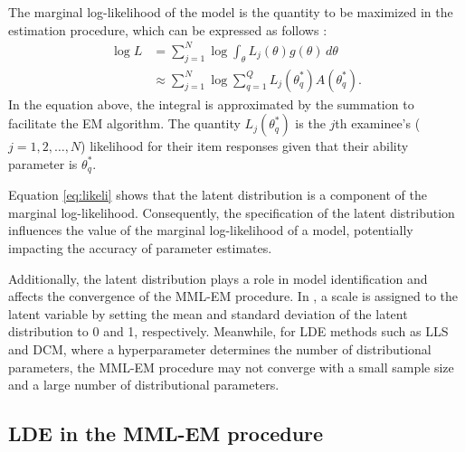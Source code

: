 The marginal log-likelihood of the model is the quantity to be maximized
in the estimation procedure, which can be expressed as follows
\citep{Baker+Kim:2004}:
\begin{equation}
\begin{split}
\log L &= \sum_{j = 1}^{N}
{ \log{ \int_{\theta}{ L_j (\theta) g (\theta) \, d \theta } } } \\
&\approx \sum_{j = 1}^{N}
{ \log{ \sum_{q = 1}^{Q}{ L_j{\left( \theta^{*}_{q} \right)}
A{\left( \theta^{*}_{q} \right)} } } }.
\end{split}
\label{eq:likeli}
\end{equation}
In the equation above, the integral is approximated by the summation
to facilitate the EM algorithm. The quantity
\(L_j{\left( \theta^{*}_{q} \right)}\) is the \(j\)th examinee's
(\(j = 1, 2, \dots, N\)) likelihood for their item responses given
that their ability parameter is \(\theta^{*}_{q}\).

Equation \eqref{eq:likeli} shows that the latent distribution is a component
of the marginal log-likelihood. Consequently, the specification of the
latent distribution influences the value of the marginal log-likelihood of a
model, potentially impacting the accuracy of parameter estimates.

Additionally, the latent distribution plays a role in model identification and
affects the convergence of the MML-EM procedure.
In , a scale is assigned to the latent variable by setting the mean and
standard deviation of the latent distribution to 0 and 1, respectively.
Meanwhile, for LDE methods such as LLS and DCM, where a hyperparameter
determines the number of distributional parameters, the MML-EM procedure may
not converge with a small sample size and a large number of distributional
parameters.

\hypertarget{lde-in-the-mml-em-procedure}{%
\subsection{LDE in the MML-EM procedure}\label{lde-in-the-mml-em-procedure}}

